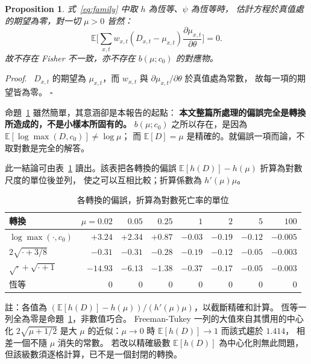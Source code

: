 \documentclass[UTF8, fontset=macnew, a4paper, 12pt]{ctexart}
\newtheorem{prop}{Proposition}
\newenvironment{proof}{\par\noindent\textit{Proof}.\ }{\hfill$\square$\par\vspace{4pt}}
\newcommand{\Ex}{\mathbb{E}}
\begin{document}
\begin{prop}\label{prop:nobias}
式~\eqref{eq:family} 中取 $h$ 為恆等、$\psi$ 為恆等時，
估計方程於真值處的期望為零，對一切 $\mu>0$ 皆然：
$$\Ex\Big[\sum_{x,t}w_{x,t}(D_{x,t}-\mu_{x,t})
\frac{\partial\mu_{x,t}}{\partial\theta}\Big]=0 .$$
故不存在 Fisher 不一致，亦不存在 $b(\mu;c_0)$ 的對應物。
\end{prop}

\begin{proof}
$D_{x,t}$ 的期望為 $\mu_{x,t}$，而 $w_{x,t}$ 與
$\partial\mu_{x,t}/\partial\theta$ 於真值處為常數，
故每一項的期望皆為零。
\end{proof}

命題~\ref{prop:nobias} 雖然簡單，其意涵卻是本報告的起點：
\textbf{本文整篇所處理的偏誤完全是轉換所造成的，不是小樣本所固有的。}
$b(\mu;c_0)$ 之所以存在，是因為 $\Ex[\log\max(D,c_0)]\neq\log\mu$；
而 $\Ex[D]=\mu$ 是精確的。就偏誤一項而論，不取對數是完全的解答。

此一結論可由表~\ref{tab:bias} 讀出。該表把各轉換的偏誤
$\Ex[h(D)]-h(\mu)$ 折算為對數尺度的單位後並列，
使之可以互相比較；折算係數為 $h'(\mu)\mu$。

\begin{table}[H]
\centering
\caption{各轉換的偏誤，折算為對數死亡率的單位}
\small
\renewcommand{\arraystretch}{1.1}
\begin{tabular}{lrrrrrrr}
\toprule
轉換 & $\mu=0.02$ & $0.05$ & $0.25$ & $1$ & $2$ & $5$ & $100$\\
\midrule
$\log\max(\cdot,c_0)$ & $+3.24$ & $+2.34$ & $+0.87$ & $-0.03$ & $-0.19$ & $-0.12$ & $-0.005$\\
$2\sqrt{\cdot+3/8}$ & $-0.31$ & $-0.31$ & $-0.28$ & $-0.19$ & $-0.12$ & $-0.05$ & $-0.003$\\
$\sqrt{\cdot}+\sqrt{\cdot+1}$ & $-14.93$ & $-6.13$ & $-1.38$ & $-0.37$ & $-0.17$ & $-0.05$ & $-0.003$\\
恆等 & $0$ & $0$ & $0$ & $0$ & $0$ & $0$ & $0$\\
\bottomrule
\end{tabular}

\vspace{2pt}
\parbox{0.92\textwidth}{\footnotesize 註：各值為
$(\Ex[h(D)]-h(\mu))/(h'(\mu)\mu)$，以截斷精確和計算。
恆等一列全為零是命題~\ref{prop:nobias}，非數值巧合。
Freeman-Tukey 一列的大值來自其慣用的中心化 $2\sqrt{\mu+1/2}$
是大 $\mu$ 的近似：$\mu\to0$ 時 $\Ex[h(D)]\to1$ 而該式趨於 $1.414$，
相差一個不隨 $\mu$ 消失的常數。
若改以精確級數 $\Ex[h(D)]$ 為中心化則無此問題，
但該級數須逐格計算，已不是一個封閉的轉換。}
\label{tab:bias}
\end{table}
\end{document}
